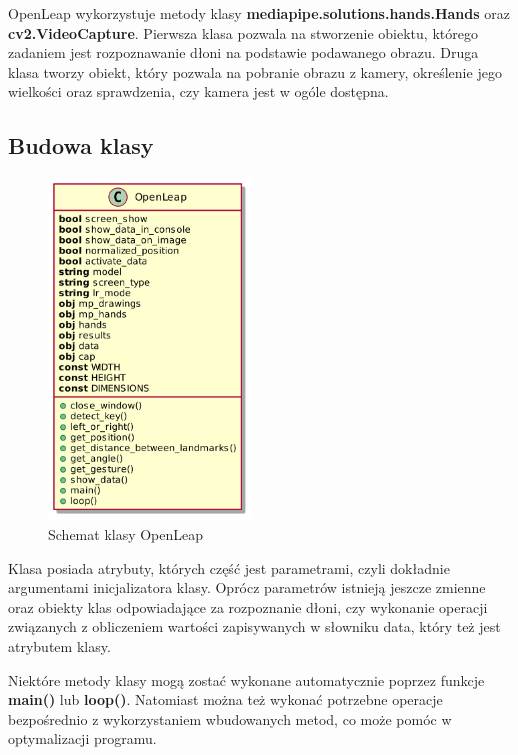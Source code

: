 \quad OpenLeap wykorzystuje metody klasy \textbf{mediapipe.solutions.hands.Hands} oraz \textbf{cv2.VideoCapture}. Pierwsza klasa pozwala na stworzenie obiektu, którego zadaniem jest rozpoznawanie dłoni na podstawie podawanego obrazu. Druga klasa tworzy obiekt, który pozwala na pobranie obrazu z kamery, określenie jego wielkości oraz sprawdzenia, czy kamera jest w ogóle dostępna. 

\newpage
\subsection{Budowa klasy}

\begin{figure}
    \begin{center}
        \includegraphics[width=0.48\textwidth]{../images/class.png}
        \end{center}
    \caption{Schemat klasy OpenLeap}
\end{figure}

\quad Klasa posiada atrybuty, których część jest parametrami, czyli dokładnie argumentami inicjalizatora klasy. Oprócz parametrów istnieją jeszcze zmienne oraz obiekty klas odpowiadające za rozpoznanie dłoni, czy wykonanie operacji związanych z obliczeniem wartości zapisywanych w słowniku data, który też jest atrybutem klasy.

\quad Niektóre metody klasy mogą zostać wykonane automatycznie poprzez funkcje \textbf{main()} lub \textbf{loop()}. Natomiast można też wykonać potrzebne operacje bezpośrednio z wykorzystaniem wbudowanych metod, co może pomóc w optymalizacji programu. \newline\newline\newline\newline\newline\newline

